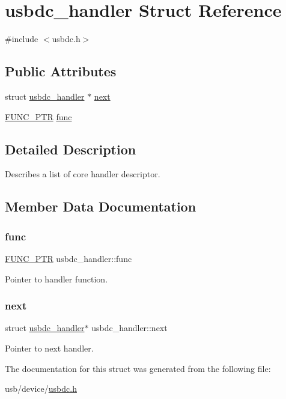 \hypertarget{structusbdc__handler}{}\section{usbdc\+\_\+handler Struct Reference}
\label{structusbdc__handler}


{\ttfamily \#include $<$usbdc.\+h$>$}

\subsection*{Public Attributes}
\begin{DoxyCompactItemize}
\item 
struct \hyperlink{structusbdc__handler}{usbdc\+\_\+handler} $\ast$ \hyperlink{structusbdc__handler_ac707b7035fa616a68a0092c7615c45c2}{next}
\item 
\hyperlink{group__doc__driver__hal__utils__macro_gae40b38bc5f5a5bd452bdd59c67d9a9cf}{F\+U\+N\+C\+\_\+\+P\+TR} \hyperlink{structusbdc__handler_a0322ba24f07544745f4c1fea33a2f2e9}{func}
\end{DoxyCompactItemize}


\subsection{Detailed Description}
Describes a list of core handler descriptor. 

\subsection{Member Data Documentation}
\mbox{\label{structusbdc__handler_a0322ba24f07544745f4c1fea33a2f2e9}} 
\subsubsection{\texorpdfstring{func}{func}}
{\footnotesize\ttfamily \hyperlink{group__doc__driver__hal__utils__macro_gae40b38bc5f5a5bd452bdd59c67d9a9cf}{F\+U\+N\+C\+\_\+\+P\+TR} usbdc\+\_\+handler\+::func}

Pointer to handler function. \mbox{\label{structusbdc__handler_ac707b7035fa616a68a0092c7615c45c2}} 
\subsubsection{\texorpdfstring{next}{next}}
{\footnotesize\ttfamily struct \hyperlink{structusbdc__handler}{usbdc\+\_\+handler}$\ast$ usbdc\+\_\+handler\+::next}

Pointer to next handler. 

The documentation for this struct was generated from the following file\+:\begin{DoxyCompactItemize}
\item 
usb/device/\hyperlink{usbdc_8h}{usbdc.\+h}\end{DoxyCompactItemize}
